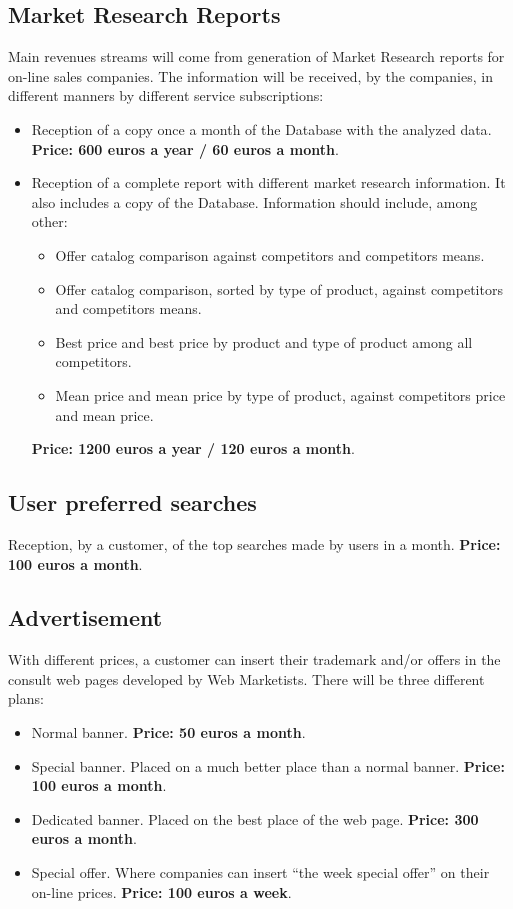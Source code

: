 \documentclass[11pt]{article}
\begin{document}
\subsection{Market Research Reports}
Main revenues streams will come from generation of Market Research reports for on-line sales companies. The information will be received, by the companies, in different manners by different service subscriptions:
\begin{itemize}
\item{Reception of a copy once a month of the Database with the analyzed data}. \textbf{Price: 600 euros a year / 60 euros a month}. 
\item{Reception of a complete report with different market research information}. It also includes a copy of the Database. Information should include, among other:
\begin{itemize}
\item{Offer catalog comparison against competitors and competitors means}.
\item{Offer catalog comparison, sorted by type of product, against competitors and competitors means}.
\item{Best price and best price by product and type of product among all competitors}.
\item{Mean price and mean price by type of product, against competitors price and mean price}.
\end{itemize}
\textbf{Price: 1200 euros a year / 120 euros a month}. 
\end{itemize}
\subsection{User preferred searches}
Reception, by a customer, of the top searches made by users in a month. \textbf{Price: 100 euros a month}.
\subsection{Advertisement}
With different prices, a customer can insert their trademark and/or offers in the consult web pages developed by Web Marketists. There will be three different plans:
\begin{itemize}
\item{Normal banner}. \textbf{Price: 50 euros a month}.
\item{Special banner}. Placed on a much better place than a normal banner. \textbf{Price: 100 euros a month}.
\item{Dedicated banner}. Placed on the best place of the web page. \textbf{Price: 300 euros a month}.
\item{Special offer}. Where companies can insert ``the week special offer'' on their on-line prices. \textbf{Price: 100 euros a week}.
\end{itemize}
\end{document}
